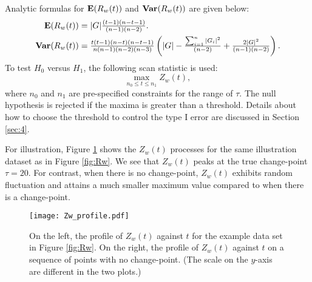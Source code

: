 \documentclass[arxiv, preprint]{imsart}
\numberwithin{equation}{section}
\theoremstyle{plain}
\begin{document}
Analytic formulas for $\mathbf{E}(R_w(t))$ and $\text{\bf Var}(R_w(t))$ are given below:
\begin{align*}
\label{eq:summary_Rw}
 \mathbf{E}(R_w(t)) & = |G| \tfrac{(t-1)(n-t-1)}{(n-1)(n-2)}. \\
 \text{\bf{Var}}(R_w(t)) & =
\tfrac{t(t-1)(n-t)(n-t-1)}{n (n-1)(n-2)(n-3)}  
 \left ( |G| -  \tfrac{\sum_{i=1}^n |G_i|^2}{(n-2)} + \tfrac{2|G|^2}{(n-1)(n-2)} \right).
\end{align*}
To test $H_0$ versus $H_1$, the following scan statistic is used: 
\begin{equation} \max_{n_0 \le t \le n_1} Z_w(t), \end{equation}
where $n_0$ and $n_1$ are pre-specified constraints for the range of $\tau$. The null hypothesis is rejected if the maxima is greater than a threshold. Details about how to choose the threshold to control the type I error are discussed in Section \ref{sec:4}. 

For illustration, Figure \ref{fig:Zw_profile} shows the $Z_w(t)$ processes for the same illustration dataset as in Figure \ref{fig:Rw}. We see that $Z_w(t)$ peaks at the true change-point $\tau = 20$. For contrast, when there is no change-point, $Z_w(t)$ exhibits random fluctuation and attains a much smaller maximum value compared to when there is a change-point. 
\begin{figure}[htp]
  \centering
    \texttt{[image: Zw\_profile.pdf]}
  \vspace{-3mm}
    \caption{On the left, the profile of $Z_w(t)$ against $t$ for the example data set in Figure \ref{fig:Rw}. On the right, the profile of $Z_w(t)$ against $t$ on a sequence of points with no change-point. (The scale on the $y$-axis are different in the two plots.)}

  \label{fig:Zw_profile}
\end{figure}
\end{document}
